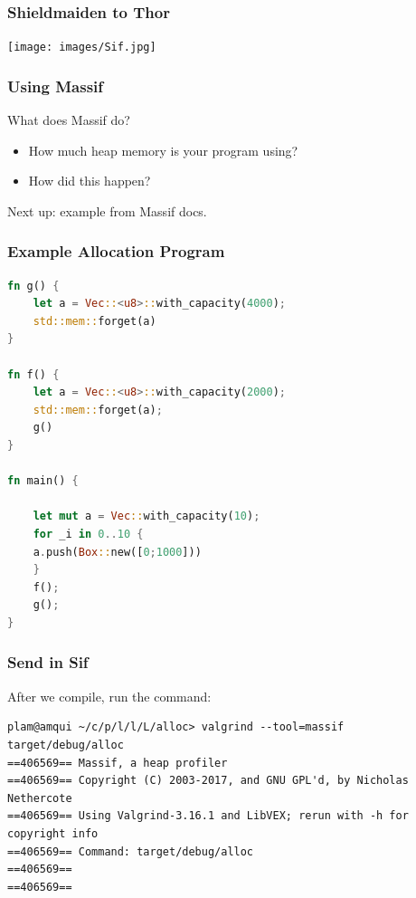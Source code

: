 \begin{frame}
\frametitle{Shieldmaiden to Thor}

\begin{center}
	\texttt{[image: images/Sif.jpg]}
\end{center}

\end{frame}



\begin{frame}
\frametitle{Using Massif}

\Large

What does Massif do? 

\begin{itemize}
\item How much heap memory is your program using?
\item How did this happen?
\end{itemize}

Next up: example from Massif docs.



\end{frame}

\begin{frame}[fragile]
\frametitle{Example Allocation Program}


\begin{lstlisting}[language=Rust]
fn g() {
    let a = Vec::<u8>::with_capacity(4000);
    std::mem::forget(a)
}

fn f() {
    let a = Vec::<u8>::with_capacity(2000);
    std::mem::forget(a);
    g()
}

fn main() {

    let mut a = Vec::with_capacity(10);
    for _i in 0..10 {
	a.push(Box::new([0;1000]))
    }
    f();
    g();
}
\end{lstlisting}

\end{frame}

\begin{frame}[fragile]
\frametitle{Send in Sif}

After we compile, run the command:
{\scriptsize
\begin{verbatim}
plam@amqui ~/c/p/l/l/L/alloc> valgrind --tool=massif target/debug/alloc
==406569== Massif, a heap profiler
==406569== Copyright (C) 2003-2017, and GNU GPL'd, by Nicholas Nethercote
==406569== Using Valgrind-3.16.1 and LibVEX; rerun with -h for copyright info
==406569== Command: target/debug/alloc
==406569== 
==406569== 
\end{verbatim}
}
\end{frame}


